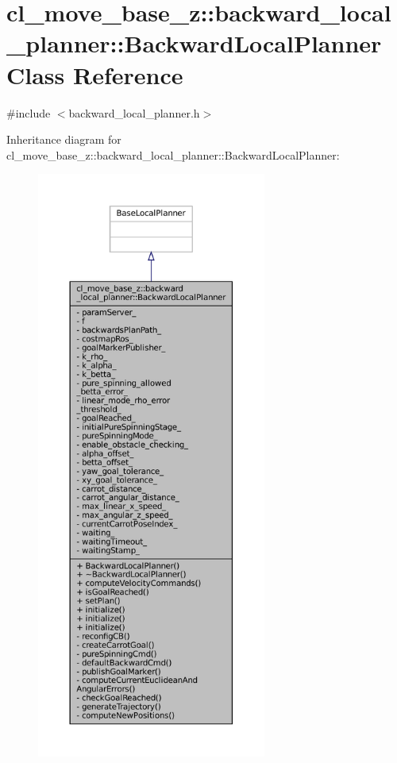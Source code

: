 \hypertarget{classcl__move__base__z_1_1backward__local__planner_1_1BackwardLocalPlanner}{}\section{cl\+\_\+move\+\_\+base\+\_\+z\+:\+:backward\+\_\+local\+\_\+planner\+:\+:Backward\+Local\+Planner Class Reference}
\label{classcl__move__base__z_1_1backward__local__planner_1_1BackwardLocalPlanner}


{\ttfamily \#include $<$backward\+\_\+local\+\_\+planner.\+h$>$}



Inheritance diagram for cl\+\_\+move\+\_\+base\+\_\+z\+:\+:backward\+\_\+local\+\_\+planner\+:\+:Backward\+Local\+Planner\+:
\nopagebreak
\begin{figure}[H]
\begin{center}
\leavevmode
\includegraphics[height=550pt]{classcl__move__base__z_1_1backward__local__planner_1_1BackwardLocalPlanner__inherit__graph}
\end{center}
\end{figure}


